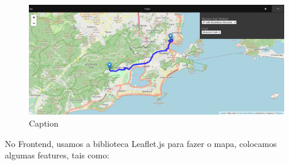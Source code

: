\documentclass{article}
\begin{document}
\begin{figure}[H]
    \centering
    \includegraphics[scale=0.5]{EDA_full_inteface_web.png}
    \caption{Caption}
    \label{fig:my_label}
\end{figure}

No Frontend, usamos a biblioteca Leaflet.js para fazer o mapa, colocamos algumas features, tais como:
\end{document}
